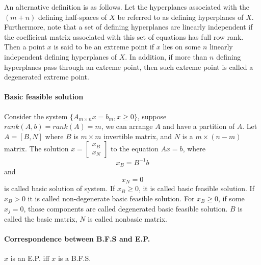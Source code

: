                     An alternative definition is as follows. Let the hyperplanes associated with the $(m + n)$ defining half-spaces of $X$ be referred to as defining hyperplanes of $X$. Furthermore, note that a set of defining hyperplanes are linearly independent if the coefficient matrix associated with this set of equations has full row rank. Then a point $x$ is said to be an extreme point if $x$ lies on some $n$ linearly independent defining hyperplanes of $X$. In addition, if more than $n$ defining hyperplanes pass through an extreme point, then such extreme point is called a degenerated extreme point.

                \paragraph{Basic feasible solution}
                    Consider the system $\{A_{m\times n}x=b_m, x\ge 0\}$, suppose $rank(A, b) = rank(A) =m$, we can arrange $A$ and have a partition of $A$. Let $A=[B, N]$ where $B$ is $m\times m$ invertible matrix, and $N$ is a $m\times (n-m)$ matrix. The solution $x=\left[\begin{matrix}x_B\\x_N\end{matrix}\right]$ to the equation $Ax=b$, where
                    \begin{equation}
                        x_B = B^{-1}b \nonumber
                    \end{equation}
                    and
                    \begin{equation}
                        x_N = 0 \nonumber
                    \end{equation}
                    is called basic solution of system. If $x_B \ge 0$, it is called basic feasible solution. If $x_B > 0$ it is called non-degenerate basic feasible solution. For $x_B \ge 0$, if some $x_j = 0$, those components are called degenerated basic feasible solution. $B$ is called the basic matrix, $N$ is called nonbasic matrix.

                \paragraph{Correspondence between B.F.S and E.P.}
                    \begin{theorem}
                        $x$ is an E.P. iff $x$ is a B.F.S.
                    \end{theorem}
                    
